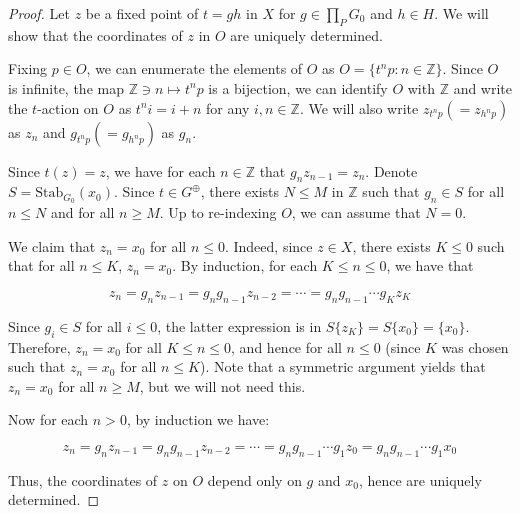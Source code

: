 \documentclass[10pt,a4paper]{amsart}
\newcommand{\Z}{\mathbb{Z}}
\begin{document}
\begin{proof}
    Let $z$ be a fixed point of $t = gh$ in $X$ for $g \in \prod_P G_0$ and $h \in H$. We will show that the coordinates of $z$ in $O$ are uniquely determined. 

    Fixing $p \in O$, we can enumerate the elements of $O$ as $O = \{t^n p : n \in \Z\}$. Since $O$ is infinite, the map $\Z \ni n \mapsto t^n p$ is a bijection, we can identify $O$ with $\Z$ and write the $t$-action on $O$ as $t^n i = i + n$ for any $i,n \in \Z$. We will also write $z_{t^n p} (= z_{h^n p})$ as $z_n$ and $g_{t^n p} (= g_{h^n p})$ as $g_n$.

    Since $t(z) = z$, we have for each $n \in \Z$ that $g_n z_{n-1} = z_n$. Denote $S = \mathrm{Stab}_{G_0}(x_0)$. Since $t \in G^{\oplus}$, there exists $N \leq M$ in $\Z$ such that $g_n \in S$ for all $n \leq N$ and for all $n \geq M$. Up to re-indexing $O$, we can assume that $N = 0$. 

    We claim that $z_n = x_0$ for all $n \leq 0$. Indeed, since $z \in X$, there exists $K \leq 0$ such that for all $n \leq K$, $z_n = x_0$. By induction, for each $K \leq n \leq 0$, we have that 
    
    $$z_n = g_nz_{n-1} = g_n g_{n-1} z_{n-2} = \cdots = g_n g_{n-1} \cdots g_K z_K$$
    
    Since $g_i \in S$ for all $i \leq 0$, the latter expression is in $S \{z_K\} = S \{x_0\} = \{x_0\}$. Therefore, $z_n = x_0$ for all $K \leq n \leq 0$, and hence for all $n \leq 0$ (since $K$ was chosen such that $z_n = x_0$ for all $n \leq K$). Note that a symmetric argument yields that $z_n = x_0$ for all $n \geq M$, but we will not need this.

    Now for each $n > 0$, by induction we have: 

    $$z_n = g_n z_{n-1} = g_n g_{n-1} z_{n-2} = \cdots = g_n g_{n-1} \cdots g_1 z_0 = g_n g_{n-1} \cdots g_1 x_0$$

    Thus, the coordinates of $z$ on $O$ depend only on $g$ and $x_0$, hence are uniquely determined. 

    
\end{proof}
\end{document}
